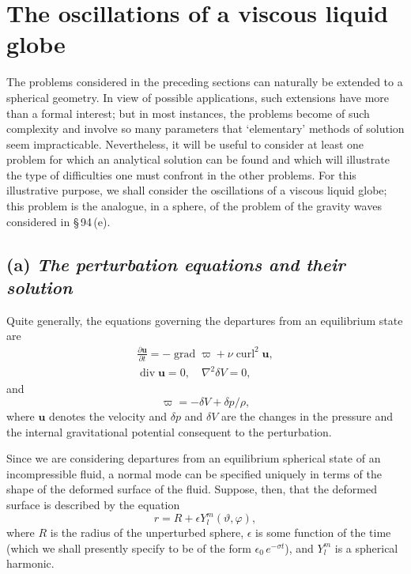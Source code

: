 \section{The oscillations of a viscous liquid globe}\label{sec:98}

The problems considered in the preceding sections can naturally be extended to a spherical geometry. In view of possible applications, such extensions have more than a formal interest; but in most instances, the problems become of such complexity and involve so many parameters that `elementary' methods of solution seem impracticable. Nevertheless, it will be useful to consider at least one problem for which an analytical solution can be found and which will illustrate the type of difficulties one must confront in the other problems. For this illustrative purpose, we shall consider the oscillations of a viscous liquid globe; this problem is the analogue, in a sphere, of the problem of the gravity waves considered in \S\,94\,(e).

\subsection*{(a) \textit{The perturbation equations and their solution}}

Quite generally, the equations governing the departures from an equilibrium state are
\begin{gather}
\frac{\partial\mathbf{u}}{\partial t} = -\operatorname{grad}\varpi + \nu\operatorname{curl}^2\mathbf{u}, \label{eq:10-236}\\
\operatorname{div}\mathbf{u} = 0, \quad \nabla^2\delta V = 0, \label{eq:10-237}
\end{gather}
and
\begin{equation}
\label{eq:10-238}
\varpi = -\delta V + \delta p/\rho,
\end{equation}
where $\mathbf{u}$ denotes the velocity and $\delta p$ and $\delta V$ are the changes in the pressure and the internal gravitational potential consequent to the perturbation.

Since we are considering departures from an equilibrium spherical state of an incompressible fluid, a normal mode can be specified uniquely in terms of the shape of the deformed surface of the fluid. Suppose, then, that the deformed surface is described by the equation
\begin{equation}
\label{eq:10-239}
r = R+\epsilon Y_l^m(\vartheta,\varphi),
\end{equation}
where $R$ is the radius of the unperturbed sphere, $\epsilon$ is some function of the time (which we shall presently specify to be of the form $\epsilon_0\,e^{-\sigma t}$), and $Y_l^m$ is a spherical harmonic.

